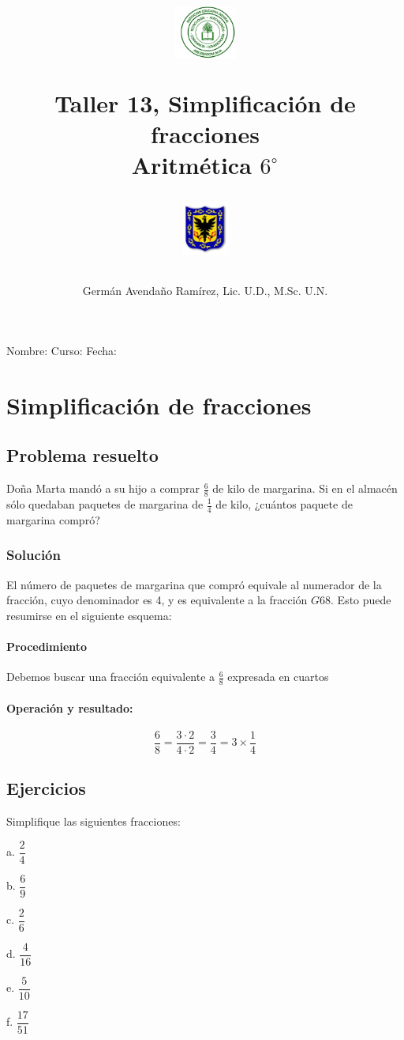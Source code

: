 \documentclass[10pt,twoside]{article}
\author{Germ\'an Avenda\~no Ram\'irez, Lic. U.D., M.Sc. U.N.}
\title{\begin{minipage}{.2\textwidth}
\includegraphics[height=1.75cm]{Images/logo-colegio.png}\end{minipage}
\begin{minipage}{.55\textwidth}
\begin{center}
Taller 13, Simplificación de fracciones  \\
Aritmética $6^{\circ}$
\end{center}
\end{minipage}\hfill
\begin{minipage}{.2\textwidth}
\includegraphics[height=1.75cm]{Images/logo-sed.png} 
\end{minipage}}
\date{}
\begin{document}
\maketitle
Nombre: \hrulefill Curso: \underline{\hspace*{44pt}} Fecha: \underline{\hspace*{2.5cm}}

\section*{Simplificaci\'{o}n de fracciones}
\subsection*{Problema resuelto}
Doña Marta mandó a su hijo a comprar $\frac{6}{8}$ de kilo de margarina. Si en el almacén sólo quedaban paquetes de margarina de $\frac{1}{4}$ de kilo, ¿cuántos paquete de margarina compró?
\subsubsection*{Soluci\'{o}n}
El n\'{u}mero de paquetes de margarina que compr\'{o} equivale al numerador de la fracci\'{o}n, cuyo denominador es 4, y es equivalente a la fracci\'{o}n $G6	8$. Esto puede resumirse en el siguiente esquema:
\paragraph*{Procedimiento}
Debemos buscar una fracción equivalente a $\frac{6}{8}$ expresada en cuartos
\paragraph*{Operación y resultado:}
\[\dfrac{6}{8}=\dfrac{3\cdot 2}{4\cdot 2}=\dfrac{3}{4}=3\times \dfrac{1}{4}\]
\subsection*{Ejercicios}
Simplifique las siguientes fracciones:
\begin{enumerate}
\begin{multicols}{3}
\item[a.] $\dfrac{2}{4}$
\item[b.] $\dfrac{6}{9}$
\item[c.] $\dfrac{2}{6}$
\item[d.] $\dfrac{4}{16}$
\item[e.] $\dfrac{5}{10}$
\item[f.] $\dfrac{17}{51}$
\end{multicols}
\end{enumerate}
\end{document}
